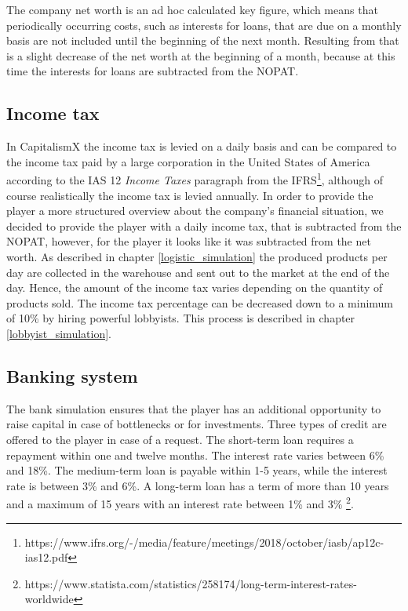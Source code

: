 The company net worth is an ad hoc calculated key figure, which means that periodically occurring costs, such as interests for loans, that are due on a monthly basis are not included until the beginning of the next month. Resulting from that is a slight decrease of the net worth at the beginning of a month, because at this time the interests for loans are subtracted from the NOPAT.
 
\subsection{Income tax}
\label{sec:incomeTax}

In CapitalismX the income tax is levied on a daily basis and can be compared to the income tax paid by a large corporation in the United States of America according to the IAS 12 \textit{Income Taxes} paragraph from the IFRS\footnote{https://www.ifrs.org/-/media/feature/meetings/2018/october/iasb/ap12c-ias12.pdf}, although of course realistically the income tax is levied annually. In order to provide the player a more structured overview about the company’s financial situation, we decided to provide the player with a daily income tax, that is subtracted from the NOPAT, however, for the player it looks like it was subtracted from the net worth. As described in chapter \ref{logistic_simulation} the produced products per day are collected in the warehouse and sent out to the market at the end of the day. Hence, the amount of the income tax varies depending on the quantity of products sold. The income tax percentage can be decreased down to a minimum of 10\% by hiring powerful lobbyists. This process is described in chapter \ref{lobbyist_simulation}.

\subsection{Banking system}
\label{sec: banking}

The bank simulation ensures that the player has an additional opportunity to raise capital in case of bottlenecks or for investments. Three types of credit are offered to the player in case of a request. 
The short-term loan requires a repayment within one and twelve months. The interest rate varies between 6\% and 18\%. The medium-term loan is payable within 1-5 years, while the interest rate is between 3\% and 6\%. A long-term loan has a term of more than 10 years and a maximum of 15 years with an interest rate between 1\% and 3\% \footnote{https://www.statista.com/statistics/258174/long-term-interest-rates-worldwide}. 

